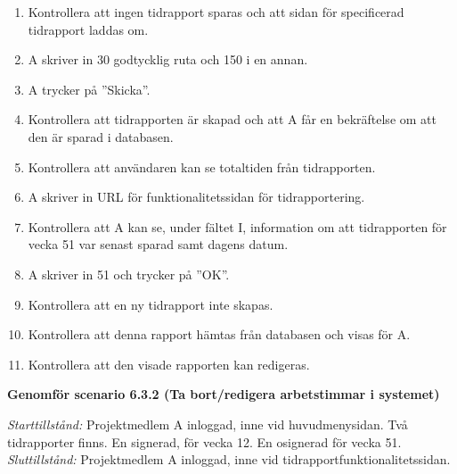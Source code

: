 \documentclass[a4paper]{article}
\begin{document}
\begin{ST}
\begin{enumerate}
\item Kontrollera att ingen tidrapport sparas och att sidan för specificerad tidrapport laddas om.
\item A skriver in 30 godtycklig ruta och 150 i en annan.
\item A trycker på ''Skicka''.
\item Kontrollera att tidrapporten är skapad och att A får en bekräftelse om att den är sparad i databasen.
\item Kontrollera att användaren kan se totaltiden från tidrapporten.
\item A skriver in URL för funktionalitetssidan för tidrapportering.
\item Kontrollera att A kan se, under fältet I, information om att tidrapporten för vecka 51 var senast sparad samt dagens datum.
\item A skriver in 51 och trycker på ''OK''.
\item Kontrollera att en ny tidrapport inte skapas.
\item Kontrollera att denna rapport hämtas från databasen och visas för A.
\item Kontrollera att den visade rapporten kan redigeras.

\end{enumerate}



\item
\textbf{Genomför scenario 6.3.2 (Ta bort/redigera arbetstimmar i systemet)}

\emph{Starttillstånd:} Projektmedlem A inloggad, inne vid huvudmenysidan. Två tidrapporter finns. En signerad, för vecka 12. En osignerad för vecka 51.\\
\emph{Sluttillstånd:} Projektmedlem A inloggad, inne vid tidrapportfunktionalitetssidan.\\


\end{ST}
\end{document}
